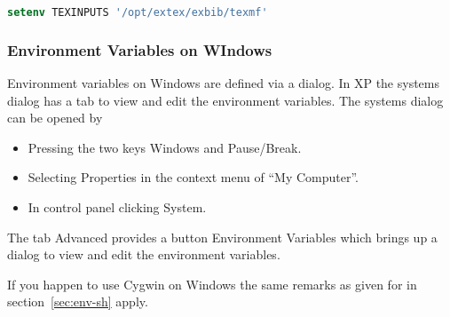 \begin{lstlisting}[language=csh]
setenv TEXINPUTS '/opt/extex/exbib/texmf'
\end{lstlisting}

\subsubsection{Environment Variables on WIndows}

Environment variables on Windows are defined via a dialog. In XP the
systems dialog has a tab to view and edit the environment variables.
The systems dialog can be opened by

\begin{itemize}
\item Pressing the two keys \textsf{Windows} and \textsf{Pause/Break}.
\item Selecting \textsf{Properties} in the context menu of ``My Computer''.
\item In control panel clicking \textsf{System}.
\end{itemize}

The tab \textsf{Advanced} provides a button \textsf{Environment
  Variables} which brings up a dialog to view and edit the environment
variables.

If you happen to use Cygwin on Windows the same remarks
as given for  in section~\ref{sec:env-sh} apply.



\endinput
%
